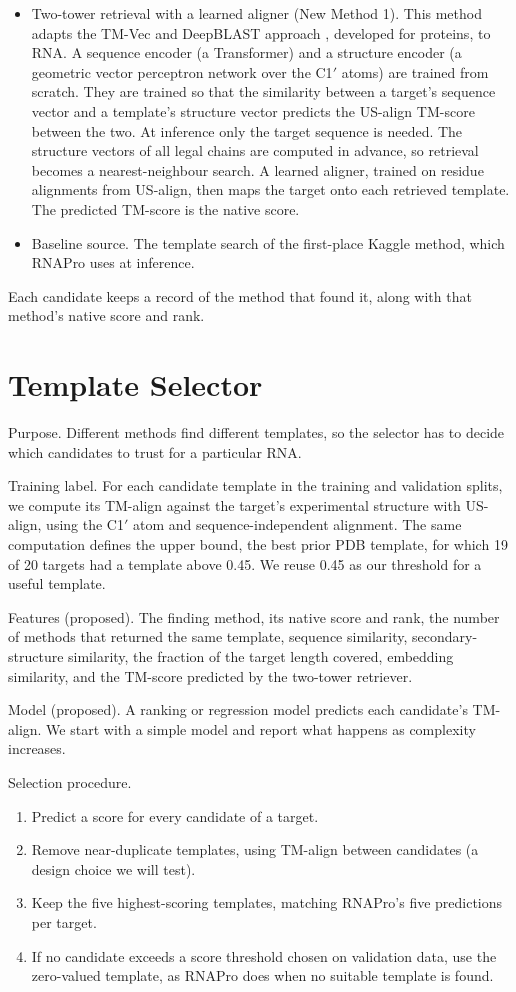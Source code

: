 \documentclass{FastFyp}
\begin{document}
\begin{itemize}
  \item Two-tower retrieval with a learned aligner (New Method 1). This method adapts the TM-Vec and DeepBLAST approach \cite{hamamsy2024}, developed for proteins, to RNA. A sequence encoder (a Transformer) and a structure encoder (a geometric vector perceptron network \cite{jing2021gvp} over the C1$'$ atoms) are trained from scratch. They are trained so that the similarity between a target's sequence vector and a template's structure vector predicts the US-align TM-score between the two. At inference only the target sequence is needed. The structure vectors of all legal chains are computed in advance, so retrieval becomes a nearest-neighbour search. A learned aligner, trained on residue alignments from US-align, then maps the target onto each retrieved template. The predicted TM-score is the native score.
  \item Baseline source. The template search of the first-place Kaggle method, which RNAPro uses at inference.
\end{itemize}
Each candidate keeps a record of the method that found it, along with that method's native score and rank.

\section{Template Selector}
Purpose. Different methods find different templates, so the selector has to decide which candidates to trust for a particular RNA.

Training label. For each candidate template in the training and validation splits, we compute its TM-align against the target's experimental structure with US-align, using the C1$'$ atom and sequence-independent alignment. The same computation defines the upper bound, the best prior PDB template, for which 19 of 20 targets had a template above 0.45. We reuse 0.45 as our threshold for a useful template.

Features (proposed). The finding method, its native score and rank, the number of methods that returned the same template, sequence similarity, secondary-structure similarity, the fraction of the target length covered, embedding similarity, and the TM-score predicted by the two-tower retriever.

Model (proposed). A ranking or regression model predicts each candidate's TM-align. We start with a simple model and report what happens as complexity increases.

Selection procedure.
\begin{enumerate}
  \item Predict a score for every candidate of a target.
  \item Remove near-duplicate templates, using TM-align between candidates (a design choice we will test).
  \item Keep the five highest-scoring templates, matching RNAPro's five predictions per target.
  \item If no candidate exceeds a score threshold chosen on validation data, use the zero-valued template, as RNAPro does when no suitable template is found.
\end{enumerate}
\end{document}
